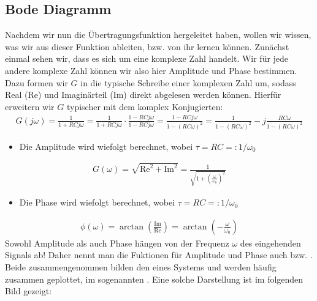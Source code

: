 \documentclass[letterpaper,10pt,english]{jupyterBook}
\begin{document}
\subsection{Bode Diagramm}
\label{\detokenize{content/5_Uebertragungsfunktion:bode-diagramm}}
\sphinxAtStartPar


\sphinxAtStartPar
Nachdem wir nun die Übertragungsfunktion hergeleitet haben, wollen wir wissen, was wir aus dieser Funktion ableiten, bzw. von ihr lernen können. Zunächst einmal sehen wir, dass es sich um eine komplexe Zahl handelt. Wir für jede andere komplexe Zahl können wir also hier Amplitude und Phase bestimmen. Dazu formen wir \(G\) in die typische Schreibe einer komplexen Zahl um, sodass Real\sphinxhyphen{} (\(\mathrm{Re}\)) und Imaginärteil (\(\mathrm{Im}\)) direkt abgelesen werden können. Hierfür erweitern wir \(G\) typischer mit dem komplex Konjugierten:
\begin{equation*}
\begin{split}G(j \omega) = \frac{1}{1+RC j \omega} = \frac{1}{1+RC j \omega} \cdot \frac{1-RC j \omega}{1-RC j \omega} = \frac{1-RC j \omega}{1- (RC \omega)^2} = \frac{1}{1- (RC \omega)^2} - j\frac{ RC \omega}{1- (RC \omega)^2}\end{split}
\end{equation*}\begin{itemize}
\item {} 
\sphinxAtStartPar
Die Amplitude wird wiefolgt berechnet, wobei \(\tau = RC =: 1/\omega_0\)

\end{itemize}
\begin{equation*}
\begin{split}G(\omega) = \sqrt{\mathrm{Re}^2 + \mathrm{Im}^2} = \frac{1}{\sqrt{1+\left(\frac{\omega}{\omega_0}\right)^2}}\end{split}
\end{equation*}\begin{itemize}
\item {} 
\sphinxAtStartPar
Die Phase wird wiefolgt berechnet, wobei \(\tau = RC =: 1/\omega_0\)

\end{itemize}
\begin{equation*}
\begin{split}\phi(\omega) = \arctan\left(\frac{\mathrm{Im}}{\mathrm{Re}}\right) = \arctan\left(-\frac{\omega}{\omega_0}\right)\end{split}
\end{equation*}
\sphinxAtStartPar
Sowohl Amplitude als auch Phase hängen von der Frequenz \(\omega\) des eingehenden Signals ab! Daher nennt man die Fuktionen für Amplitude und Phase auch  bzw. . Beide zusammengenommen bilden den  eines Systems und werden häufig zusammen geplottet, im sogenannten . Eine solche Darstellung ist im folgenden Bild gezeigt:
\end{document}
